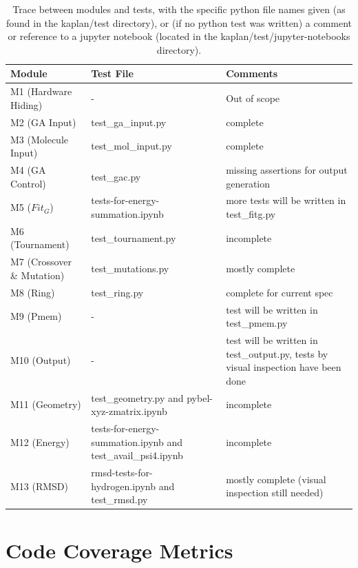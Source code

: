 \documentclass[12pt, titlepage]{article}
\begin{document}
\begin{table}[H]
\begin{adjustwidth}{-0.7in}{-0.5in}
\begin{center}

	\centering
	\begin{tabular}{p{} p{} p{}}
		\toprule
		\textbf{Module} & \textbf{Test File} & \textbf{Comments} \\
		\midrule
		M1 (Hardware Hiding) & - & Out of scope \\
		M2 (GA Input) & test\_ga\_input.py & complete \\
		M3 (Molecule Input) & test\_mol\_input.py & complete \\
		M4 (GA Control) & test\_gac.py & missing assertions for output 
		generation \\
		M5 ($Fit_G$) & tests-for-energy-summation.ipynb & more tests will be 
		written in test\_fitg.py \\
		M6 (Tournament) & test\_tournament.py & incomplete \\
		M7 (Crossover \& Mutation) & test\_mutations.py & mostly complete \\
		M8 (Ring) & test\_ring.py & complete for current spec \\
		M9 (Pmem) & - & test will be written in test\_pmem.py \\
		M10 (Output) & - & test will be written in test\_output.py, tests by 
		visual inspection have been done \\
		M11 (Geometry) & test\_geometry.py and pybel-xyz-zmatrix.ipynb & 
		incomplete \\
		M12 (Energy) & tests-for-energy-summation.ipynb and 
		test\_avail\_psi4.ipynb & incomplete \\
		M13 (RMSD) & rmsd-tests-for-hydrogen.ipynb and test\_rmsd.py & mostly 
		complete (visual inspection still needed) \\
		\bottomrule
	\end{tabular}
	\caption{Trace between modules and tests, with the specific python 
		file names given (as found in the kaplan/test directory), or (if no 
		python test was written) a comment or reference to a jupyter notebook 
		(located in the kaplan/test/jupyter-notebooks directory).}
	\label{trace-MT}

\end{center}
\end{adjustwidth}
\end{table}	

\section{Code Coverage Metrics}
\end{document}
